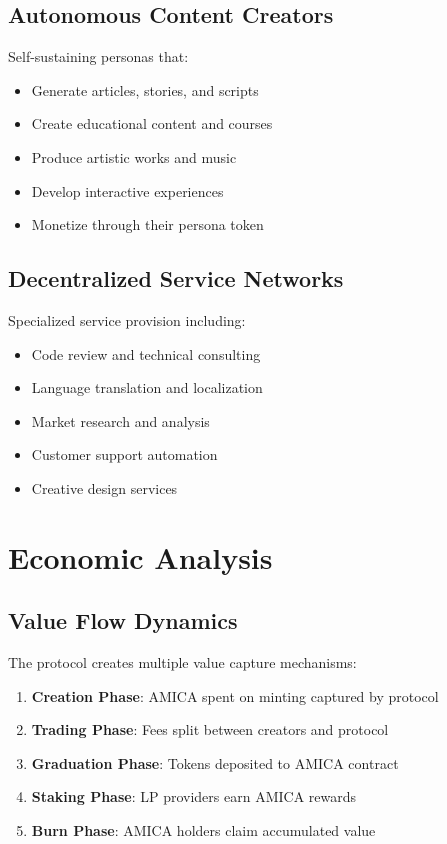 \documentclass{article}
\begin{document}
\subsection{Autonomous Content Creators}

Self-sustaining personas that:
\begin{itemize}
    \item Generate articles, stories, and scripts
    \item Create educational content and courses
    \item Produce artistic works and music
    \item Develop interactive experiences
    \item Monetize through their persona token
\end{itemize}

\subsection{Decentralized Service Networks}

Specialized service provision including:
\begin{itemize}
    \item Code review and technical consulting
    \item Language translation and localization
    \item Market research and analysis
    \item Customer support automation
    \item Creative design services
\end{itemize}

\section{Economic Analysis}

\subsection{Value Flow Dynamics}

The protocol creates multiple value capture mechanisms:

\begin{enumerate}
    \item \textbf{Creation Phase}: AMICA spent on minting captured by protocol
    \item \textbf{Trading Phase}: Fees split between creators and protocol
    \item \textbf{Graduation Phase}: Tokens deposited to AMICA contract
    \item \textbf{Staking Phase}: LP providers earn AMICA rewards
    \item \textbf{Burn Phase}: AMICA holders claim accumulated value
\end{enumerate}
\end{document}
